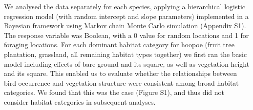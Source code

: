 \documentclass[
]{article}
\newenvironment{Shaded}{\begin{snugshade}}{\end{snugshade}}
\newcommand{\CommentTok}[1]{\textcolor[rgb]{0.56,0.35,0.01}{\textit{#1}}}
\newcommand{\DecValTok}[1]{\textcolor[rgb]{0.00,0.00,0.81}{#1}}
\newcommand{\FunctionTok}[1]{\textcolor[rgb]{0.13,0.29,0.53}{\textbf{#1}}}
\newcommand{\NormalTok}[1]{#1}
\newcommand{\OtherTok}[1]{\textcolor[rgb]{0.56,0.35,0.01}{#1}}
\newcommand{\SpecialCharTok}[1]{\textcolor[rgb]{0.81,0.36,0.00}{\textbf{#1}}}
\begin{document}
\begin{Shaded}
\end{Shaded}

We analysed the data separately for each species, applying a
hierarchical logistic regression model (with random intercept and slope
parameters) implemented in a Bayesian framework using Markov chain Monte
Carlo simulation (Appendix S1). The response variable was Boolean, with
a 0 value for random locations and 1 for foraging locations. For each
dominant habitat category for hoopoe (fruit tree plantation, grassland,
all remaining habitat types together) we first ran the basic model
including effects of bare ground and its square, as well as vegetation
height and its square. This enabled us to evaluate whether the
relationships between bird occurrence and vegetation structure were
consistent among broad habitat categories. We found that this was the
case (Figure S1), and thus did not consider habitat categories in
subsequent analyses.

\begin{Shaded}
\end{Shaded}
\end{document}
